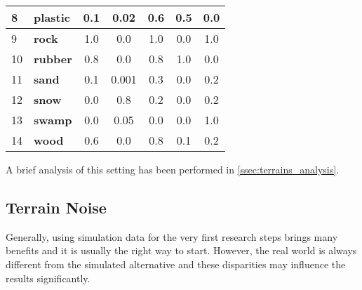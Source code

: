 \begin{table}[H]
\begin{tabular}{|l|l|c|c|c|c|c|}
8                         & \textbf{plastic}       & 0.1                                     & 0.02                                       & 0.6                                    & 0.5                                      & 0.0                                  \\ \hline
9                         & \textbf{rock}          & 1.0                                     & 0.0                                        & 1.0                                    & 0.0                                      & 1.0                                  \\ \hline
10	 					  & \textbf{rubber}        & 0.8                                     & 0.0                                        & 0.8                                    & 1.0                                      & 0.0                                  \\ \hline
11                        & \textbf{sand}          & 0.1                                     & 0.001                                      & 0.3                                    & 0.0                                      & 0.2                                  \\ \hline
12                        & \textbf{snow}          & 0.0                                     & 0.8                                        & 0.2                                    & 0.0                                      & 0.2                                  \\ \hline
13                        & \textbf{swamp}         & 0.0                                     & 0.05                                       & 0.0                                    & 0.0                                      & 1.0                                  \\ \hline
14                        & \textbf{wood}          & 0.6                                     & 0.0                                        & 0.8                                    & 0.1                                      & 0.2                                  \\ \hline
\end{tabular}
\end{table}

A brief analysis of this setting has been performed in \cref{ssec:terrains_analysis}.

\subsection{Terrain Noise} \label{ssec:terrain_noise}
Generally, using simulation data for the very first research steps brings many benefits and it is usually the right way to start. However, the real world is always different from the simulated alternative and these disparities may influence the results significantly.

